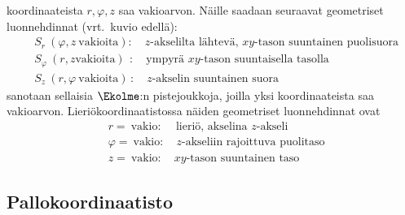 koordinaateista $r,\varphi,z$ saa vakioarvon. Näille saadaan seuraavat geometriset luonnehdinnat
(vrt.\ kuvio edellä):
\begin{align*}
&S_r\       (\varphi,z\ \text{vakioita}): \quad \text{$z$-akselilta lähtevä, 
                                                      $xy$-tason suuntainen puolisuora} \\
&S_\varphi\ (r,z \text{vakioita})\,\ :  \quad \text{ympyrä $xy$-tason suuntaisella tasolla} \\
&S_z\       (r,\varphi\ \text{vakioita})\, : \quad \text{$z$-akselin suuntainen suora}
\end{align*}
 sanotaan sellaisia $\Ekolme$:n pistejoukkoja, joilla yksi
koordinaateista saa vakioarvon. Lieriökoordinaatistossa näiden geometriset luonnehdinnat ovat
\begin{align*}
&r=\ \text{vakio}:       \quad\, \text{lieriö, akselina $z$-akseli} \\
&\varphi=\ \text{vakio}: \quad   \text{$z$-akseliin rajoittuva puolitaso} \\
&z=\ \text{vakio}:       \quad   \text{$xy$-tason suuntainen taso}
\end{align*}

\subsection{Pallokoordinaatisto}

